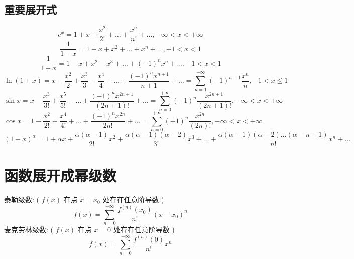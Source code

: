 \subsection{重要展开式}
\begin{theorem}\label{the: 重要幂级数展开式}
	$$e^{x}=1+x+\frac{x^2}{2!}+\dots+\frac{x^n}{n!}+\dots ,-\infty<x<+\infty$$
	$$\frac{1}{1-x}=1+x+x^2+\dots+x^{n}+\dots,-1<x<1$$
	$$\frac{1}{1+x}=1-x+x^2-x^3+\dots+(-1)^{n}x^{n}+\dots,-1<x<1$$
	$$\ln(1+x)=x-\frac{x^2}{2}+\frac{x^3}{3}-\frac{x^4}{4}+\dots+\frac{(-1)^nx^{n+1}}{n+1}+\dots=\sum\limits_{n=1}^{+\infty}(-1)^{n-1}\frac{x^{n}}{n},-1<x\leq 1$$
	$$\sin x=x-\frac{x^3}{3!}+\frac{x^5}{5!}-\dots+\frac{(-1)^{n}x^{2n+1}}{(2n+1)!}+\dots=\sum\limits_{n=0}^{+\infty}(-1)^{n}\frac{x^{2n+1}}{(2n+1)!},-\infty<x<+\infty$$
	$$\cos x=1-\frac{x^2}{2!}+\frac{x^4}{4!}+\dots+\frac{(-1)^nx^{2n}}{2n!}+\dots=\sum\limits_{n=0}^{+\infty}(-1)^{n}\frac{x^{2n}}{(2n)!},-\infty<x<+\infty$$
	$$(1+x)^{\alpha}=1+\alpha x+\frac{\alpha (\alpha-1)}{2!}x^2+\frac{\alpha (\alpha-1)(\alpha-2)}{3!}x^3+\dots+\frac{\alpha (\alpha-1)(\alpha-2)\dots(\alpha-n+1)}{n!}x^n+\dots$$
\end{theorem}
\section{函数展开成幂级数}

\begin{definition}\label{函数展开成幂级数}
	泰勒级数:  ( $f(x)$ 在点 $x=x_{0}$ 处存在任意阶导数 )
	$$f(x)=\sum\limits_{n=0}^{+\infty}\frac{f^{(n)}(x_{0})}{n!}(x-x_{0})^n$$
	麦克劳林级数:  ( $f(x)$ 在点 $x=0$ 处存在任意阶导数 )
	$$f(x)=\sum\limits_{n=0}^{+\infty}\frac{f^{(n)}(0)}{n!}x^n$$
\end{definition}
